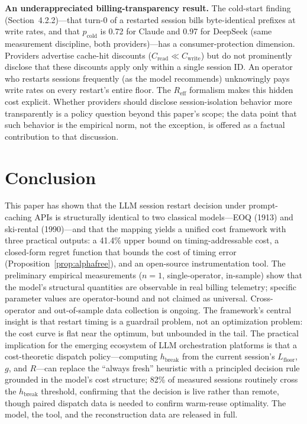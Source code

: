 \documentclass[11pt]{article}
\theoremstyle{definition}
\theoremstyle{remark}
\begin{document}
\textbf{An underappreciated billing-transparency result.} The cold-start finding (Section~4.2.2)---that turn-0 of a restarted session bills byte-identical prefixes at write rates, and that $p_{\text{cold}}$ is 0.72 for Claude and 0.97 for DeepSeek (same measurement discipline, both providers)---has a consumer-protection dimension. Providers advertise cache-hit discounts ($C_{\text{read}} \ll C_{\text{write}}$) but do not prominently disclose that these discounts apply only within a single session ID. An operator who restarts sessions frequently (as the model recommends) unknowingly pays write rates on every restart's entire floor. The $R_{\text{eff}}$ formalism makes this hidden cost explicit. Whether providers should disclose session-isolation behavior more transparently is a policy question beyond this paper's scope; the data point that such behavior is the empirical norm, not the exception, is offered as a factual contribution to that discussion.

\section{Conclusion}

This paper has shown that the LLM session restart decision under prompt-caching APIs is structurally identical to two classical models---EOQ (1913) and ski-rental (1990)---and that the mapping yields a unified cost framework with three practical outputs: a 41.4\% upper bound on timing-addressable cost, a closed-form regret function that bounds the cost of timing error (Proposition~\ref{prop:alphafree}), and an open-source instrumentation tool. The preliminary empirical measurements ($n=1$, single-operator, in-sample) show that the model's structural quantities are observable in real billing telemetry; specific parameter values are operator-bound and not claimed as universal. Cross-operator and out-of-sample data collection is ongoing. The framework's central insight is that restart timing is a guardrail problem, not an optimization problem: the cost curve is flat near the optimum, but unbounded in the tail. The practical implication for the emerging ecosystem of LLM orchestration platforms is that a cost-theoretic dispatch policy---computing $h_{\text{break}}$ from the current session's $L_{\text{floor}}$, $g$, and $R$---can replace the ``always fresh'' heuristic with a principled decision rule grounded in the model's cost structure; 82\% of measured sessions routinely cross the $h_{\text{break}}$ threshold, confirming that the decision is live rather than remote, though paired dispatch data is needed to confirm warm-reuse optimality. The model, the tool, and the reconstruction data are released in full.
\end{document}
